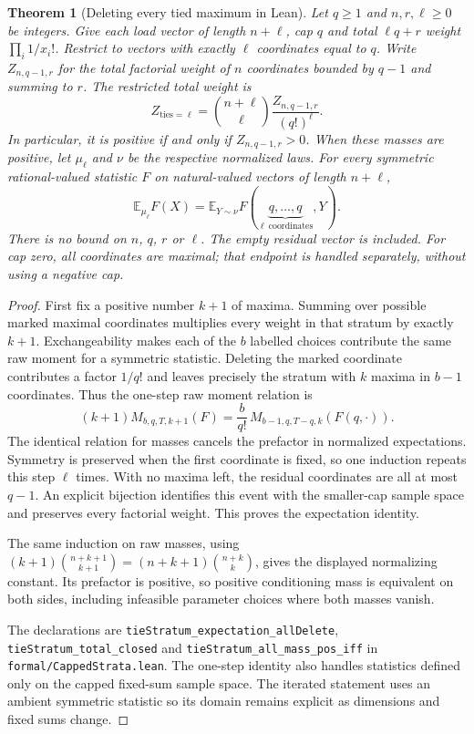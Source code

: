 \documentclass[11pt]{article}
\newtheorem{theorem}{Theorem}
\begin{document}
\begin{theorem}[Deleting every tied maximum in Lean]\label{thm:leanstrata}
Let $q\geq1$ and $n,r,\ell\geq0$ be integers. Give each load vector of
length $n+\ell$, cap $q$ and total $\ell q+r$ weight $\prod_i1/x_i!$.
Restrict to vectors with exactly $\ell$ coordinates equal to $q$.
Write $Z_{n,q-1,r}$ for the total factorial weight of $n$ coordinates
bounded by $q-1$ and summing to $r$. The restricted total weight is
\[
 Z_{\mathrm{ties}=\ell}
 =\binom{n+\ell}{\ell}\frac{Z_{n,q-1,r}}{(q!)^\ell}.
\]
In particular, it is positive if and only if $Z_{n,q-1,r}>0$.
When these masses are positive, let $\mu_\ell$ and $\nu$ be the respective
normalized laws. For every symmetric rational-valued statistic $F$ on
natural-valued vectors of length $n+\ell$,
\[
 \mathbb E_{\mu_\ell}F(X)
 =\mathbb E_{Y\sim\nu}
   F(\underbrace{q,\ldots,q}_{\ell\ \mathrm{coordinates}},Y).
\]
There is no bound on $n$, $q$, $r$ or $\ell$. The empty residual vector
is included. For cap zero, all coordinates are maximal; that endpoint
is handled separately, without using a negative cap.
\end{theorem}
\begin{proof}
First fix a positive number $k+1$ of maxima. Summing over possible
marked maximal coordinates multiplies every weight in that stratum by
exactly $k+1$. Exchangeability makes each of the $b$ labelled choices
contribute the same raw moment for a symmetric statistic. Deleting the
marked coordinate contributes a factor $1/q!$ and leaves precisely the
stratum with $k$ maxima in $b-1$ coordinates. Thus the one-step raw
moment relation is
\[
 (k+1)M_{b,q,T,k+1}(F)
 =\frac{b}{q!}\,M_{b-1,q,T-q,k}(F(q,\cdot)).
\]
The identical relation for masses cancels the prefactor in normalized
expectations. Symmetry is preserved when the first coordinate is fixed,
so one induction repeats this step $\ell$ times. With no maxima left,
the residual coordinates are all at most $q-1$. An explicit bijection
identifies this event with the smaller-cap sample space and preserves
every factorial weight. This proves the expectation identity.

The same induction on raw masses, using
$(k+1)\binom{n+k+1}{k+1}=(n+k+1)\binom{n+k}{k}$,
gives the displayed normalizing constant. Its prefactor is positive,
so positive conditioning mass is equivalent on both sides, including
infeasible parameter choices where both masses vanish.

The declarations are \texttt{tieStratum\_expectation\_allDelete},
\texttt{tieStratum\_total\_closed} and
\texttt{tieStratum\_all\_mass\_pos\_iff} in
\texttt{formal/CappedStrata.lean}. The one-step identity also handles
statistics defined only on the capped fixed-sum sample space. The
iterated statement uses an ambient symmetric statistic so its domain
remains explicit as dimensions and fixed sums change.
\end{proof}
\end{document}
